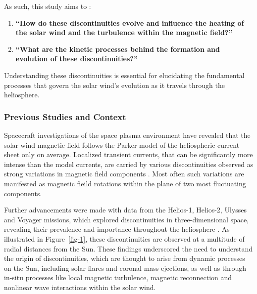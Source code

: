 \documentclass[
  letterpaper,
  DIV=11,
  numbers=noendperiod]{scrartcl}
\begin{document}
As such, this study aims to :

\begin{enumerate}
\def\labelenumi{\arabic{enumi}.}
\item
  \textbf{``How do these discontinuities evolve and influence the heating of the solar wind and the turbulence within the magnetic field?''}
\item
  \textbf{``What are the kinetic processes behind the formation and evolution of these discontinuities?''}
\end{enumerate}

Understanding these discontinuities is essential for elucidating the fundamental processes that govern the solar wind's evolution as it travels through the heliosphere.

\subsubsection{Previous Studies and Context}\label{previous-studies-and-context}

Spacecraft investigations of the space plasma environment have revealed that the solar wind magnetic field follows the Parker model of the heliospheric current sheet only on average. Localized transient currents, that can be significantly more intense than the model currents, are carried by various discontinuities observed as strong variations in magnetic field components \citep{colburnDiscontinuitiesSolarWind1966, burlagaMicroscaleStructuresInterplanetary1968, turnerOrientationsRotationalTangential1971}. Most often such variations are manifested as magnetic fieild rotations within the plane of two most fluctuating components.

Further advancements were made with data from the Helios-1, Helios-2, Ulysses and Voyager missions, which explored discontinuities in three-dimensional space, revealing their prevalence and importance throughout the heliosphere \citep{marianiStatisticalStudyMagnetohydrodynamic1983, tsurutaniNonlinearElectromagneticWaves1997}. As illustrated in Figure~\ref{fig-1}, these discontinuities are observed at a multitude of radial distances from the Sun. These findings underscored the need to understand the origin of discontinuities, which are thought to arise from dynamic processes on the Sun, including solar flares and coronal mass ejections, as well as through in-situ processes like local magnetic turbulence, magnetic reconnection and nonlinear wave interactions within the solar wind.
\end{document}
